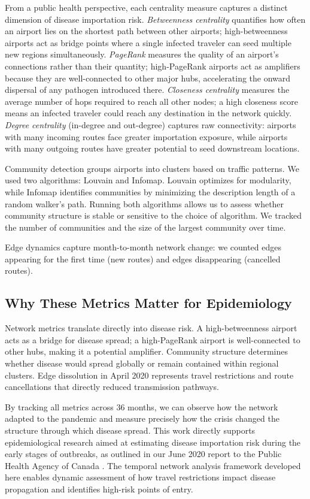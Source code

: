 \documentclass{elsarticle}
\begin{document}
From a public health perspective, each centrality measure captures a distinct dimension of disease importation risk. \textit{Betweenness centrality} quantifies how often an airport lies on the shortest path between other airports; high-betweenness airports act as bridge points where a single infected traveler can seed multiple new regions simultaneously. \textit{PageRank} measures the quality of an airport's connections rather than their quantity; high-PageRank airports act as amplifiers because they are well-connected to other major hubs, accelerating the onward dispersal of any pathogen introduced there. \textit{Closeness centrality} measures the average number of hops required to reach all other nodes; a high closeness score means an infected traveler could reach any destination in the network quickly. \textit{Degree centrality} (in-degree and out-degree) captures raw connectivity: airports with many incoming routes face greater importation exposure, while airports with many outgoing routes have greater potential to seed downstream locations.

Community detection groups airports into clusters based on traffic patterns. We used two algorithms: Louvain and Infomap. Louvain optimizes for modularity, while Infomap identifies communities by minimizing the description length of a random walker's path. Running both algorithms allows us to assess whether community structure is stable or sensitive to the choice of algorithm. We tracked the number of communities and the size of the largest community over time.

Edge dynamics capture month-to-month network change: we counted edges appearing for the first time (new routes) and edges disappearing (cancelled routes).

\subsection{Why These Metrics Matter for Epidemiology}

Network metrics translate directly into disease risk. A high-betweenness airport acts as a bridge for disease spread; a high-PageRank airport is well-connected to other hubs, making it a potential amplifier. Community structure determines whether disease would spread globally or remain contained within regional clusters. Edge dissolution in April 2020 represents travel restrictions and route cancellations that directly reduced transmission pathways.

By tracking all metrics across 36 months, we can observe how the network adapted to the pandemic and measure precisely how the crisis changed the structure through which disease spread. This work directly supports epidemiological research aimed at estimating disease importation risk during the early stages of outbreaks, as outlined in our June 2020 report to the Public Health Agency of Canada \cite{PHAC2020}. The temporal network analysis framework developed here enables dynamic assessment of how travel restrictions impact disease propagation and identifies high-risk points of entry.
\end{document}

